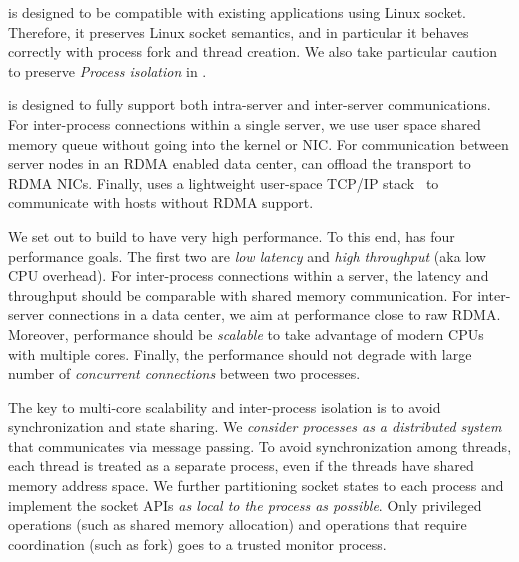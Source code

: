 \sys is designed to be compatible with existing applications using Linux socket. Therefore, it preserves Linux socket semantics, and in particular it behaves correctly with process fork and thread creation. We also take particular caution to preserve \textit{Process isolation} in \sys.

\sys is designed to fully support both intra-server and inter-server communications. For inter-process connections within a single server, we use user space shared memory queue without going into the kernel or NIC. For communication between server nodes in an RDMA enabled data center, \sys can offload the transport to RDMA NICs. Finally, \sys uses a lightweight user-space TCP/IP stack~\cite{dunkels2001design} to communicate with hosts without RDMA support.


We set out to build \sys{} to have very high performance. To this end, \sys has four performance goals. The first two are \textit{low latency} and \textit{high throughput} (aka low CPU overhead). For inter-process connections within a server, the latency and throughput should be comparable with shared memory communication. For inter-server connections in a data center, we aim at performance close to raw RDMA. Moreover, performance should be \textit{scalable} to take advantage of modern CPUs with multiple cores. Finally, the performance should not degrade with large number of \textit{concurrent connections} between two processes. 

The key to multi-core scalability and inter-process isolation is to avoid synchronization and state sharing. We \textit{consider processes as a distributed system} that communicates via message passing. To avoid synchronization among threads, each thread is treated as a separate process, even if the threads have shared memory address space. We further partitioning socket states to each process and implement the socket APIs \textit{as local to the process as possible}. Only privileged operations (such as shared memory allocation) and operations that require coordination (such as fork) goes to a trusted monitor process.

